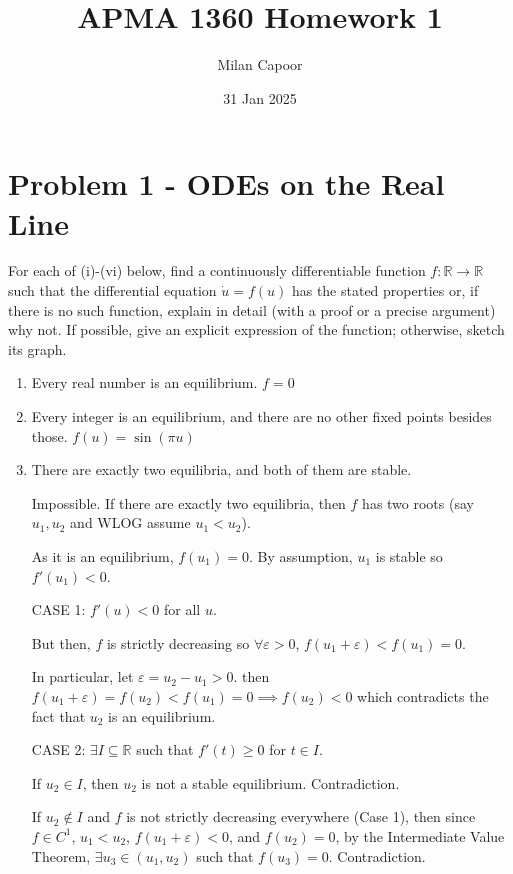 \documentclass[12pt]{article}
\title{APMA 1360 Homework 1}
\author{Milan Capoor}
\date{31 Jan 2025}
\newcommand{\R}{\mathbb{R}}
\newcommand{\ep}{\varepsilon}
\newcommand{\sub}{\subseteq}
\begin{document}
\maketitle

\section*{Problem 1 - ODEs on the Real Line}
For each of (i)-(vi) below, find a continuously differentiable function $f : \R \to \R$ such that the differential equation $\dot u = f (u)$ has the stated properties or, if there is no such function, explain in detail (with a proof or a precise
argument) why not. If possible, give an explicit expression of the function; otherwise, sketch its graph.

\begin{enumerate}[label=(\roman*)]
    \item Every real number is an equilibrium.
          \color{blue}
          $\boxed{f = 0}$
          \color{black}

    \item Every integer is an equilibrium, and there are no other fixed points besides those.
          \color{blue}
          $\boxed{f(u) = \sin(\pi u)}$
          \color{black}

    \item There are exactly two equilibria, and both of them are stable.

          \color{blue}
          Impossible. If there are exactly two equilibria, then $f$ has two roots (say $u_1, u_2$ and WLOG assume $u_1 < u_2$).

          As it is an equilibrium, $f(u_1) = 0$. By assumption, $u_1$ is stable so $f'(u_1) < 0$.

          CASE 1: $f'(u) < 0$ for all $u$.

          But then, $f$ is strictly decreasing so $\forall \ep > 0$, $f(u_1 + \ep) < f(u_1) = 0 $.

          In particular, let $\ep = u_2 - u_1 > 0$. then $f(u_1 + \ep) = f(u_2) < f(u_1) = 0 \implies f(u_2) < 0$ which contradicts the fact that $u_2$ is an equilibrium.

          CASE 2: $\exists I \sub \R$ such that $f'(t) \geq 0$ for $t \in I$.

          If $u_2 \in I$, then $u_2$ is not a stable equilibrium. Contradiction.

          If $u_2 \notin I$ and $f$ is not strictly decreasing everywhere (Case 1), then since $f \in C^1$, $u_1 < u_2$, $f(u_1 + \ep) < 0$, and $f(u_2) = 0$, by the Intermediate Value Theorem, $\exists u_3 \in (u_1, u_2)$ such that $f(u_3) = 0$. Contradiction.


\end{enumerate}
\end{document}
